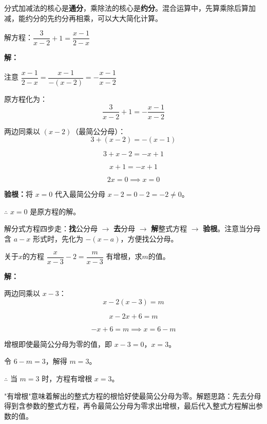 \documentclass[12pt, a4paper]{ctexart}
\begin{document}
\begin{tipbox}[方法总结]
分式加减法的核心是\textbf{通分}，乘除法的核心是\textbf{约分}。混合运算中，先算乘除后算加减，能约分的先约分再相乘，可以大大简化计算。
\end{tipbox}

\begin{examplebox}[【例题4】解分式方程]
解方程：$\dfrac{3}{x-2} + 1 = \dfrac{x-1}{2-x}$

\bigskip
\textbf{解：}

注意 $\dfrac{x-1}{2-x} = \dfrac{x-1}{-(x-2)} = -\dfrac{x-1}{x-2}$

原方程化为：
\[
\frac{3}{x-2} + 1 = -\frac{x-1}{x-2}
\]

两边同乘以 $(x-2)$（最简公分母）：
\[
3 + (x-2) = -(x-1)
\]

\[
3 + x - 2 = -x + 1
\]

\[
x + 1 = -x + 1
\]

\[
2x = 0 \implies x = 0
\]

\textbf{验根：}将 $x=0$ 代入最简公分母 $x-2 = 0-2 = -2 \neq 0$。

$\therefore$ $x=0$ 是原方程的解。
\end{examplebox}

\begin{tipbox}[方法总结]
解分式方程四步走：\textbf{找}公分母 $\to$ \textbf{去}分母 $\to$ \textbf{解}整式方程 $\to$ \textbf{验根}。注意当分母含 $a-x$ 形式时，先化为 $-(x-a)$，方便找公分母。
\end{tipbox}

\begin{examplebox}[【例题5】分式方程有增根的情况]
关于$x$的方程 $\dfrac{x}{x-3} - 2 = \dfrac{m}{x-3}$ 有增根，求$m$的值。

\bigskip
\textbf{解：}

两边同乘以 $x - 3$：
\[
x - 2(x-3) = m
\]

\[
x - 2x + 6 = m
\]

\[
-x + 6 = m \implies x = 6 - m
\]

增根即使最简公分母为零的值，即 $x - 3 = 0$，$x = 3$。

令 $6 - m = 3$，解得 $m = 3$。

$\therefore$ 当 $m = 3$ 时，方程有增根 $x = 3$。
\end{examplebox}

\begin{tipbox}[方法总结]
"有增根"意味着解出的整式方程的根恰好使最简公分母为零。解题思路：先去分母得到含参数的整式方程，再令最简公分母为零求出增根，最后代入整式方程解出参数的值。
\end{tipbox}
\end{document}
